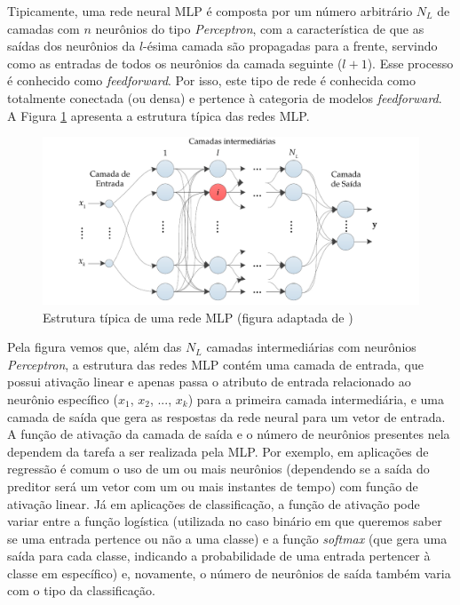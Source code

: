 \documentclass[a4paper, 12pt]{article}
\begin{document}
Tipicamente, uma rede neural MLP é composta por um número arbitrário $N_L$ de  camadas com $n$ neurônios do tipo \textit{Perceptron}, com a característica de que as saídas dos neurônios da $l$-ésima camada são propagadas para a frente, servindo como as entradas de todos os neurônios da camada seguinte ($l+1$). Esse processo é conhecido como \textit{feedforward}. Por isso, este tipo de rede é conhecida como totalmente conectada (ou densa) e pertence à categoria de modelos \textit{feedforward}. A Figura \ref{fig:mlp-architecture} apresenta a estrutura típica das redes MLP.

\begin{figure}[!ht]
\centering
\includegraphics[scale = 0.8]{mlp-network.pdf}
\caption{Estrutura típica de uma rede MLP (figura adaptada de \cite{boccato2013novas}) }
\label{fig:mlp-architecture}
\end{figure}

Pela figura vemos que, além das $N_L$ camadas intermediárias com neurônios \textit{Perceptron}, a estrutura das redes MLP contém uma camada de entrada, que possui ativação linear e apenas passa o atributo de entrada relacionado ao neurônio específico ($x_1$, $x_2$, ..., $x_k$) para a primeira camada intermediária, e uma camada de saída que gera as respostas da rede neural para um vetor de entrada. A função de ativação da camada de saída e o número de neurônios presentes nela dependem da tarefa a ser realizada pela MLP. Por exemplo, em aplicações de regressão é comum o uso de um ou mais neurônios (dependendo se a saída do preditor será um vetor com um ou mais instantes de tempo) com função de ativação linear. Já em aplicações de classificação, a função de ativação pode variar entre a função logística (utilizada no caso binário em que queremos saber se uma entrada pertence ou não a uma classe) e a função \textit{softmax} (que gera uma saída para cada classe, indicando a probabilidade de uma entrada pertencer à classe em específico) e, novamente, o número de neurônios de saída também varia com o tipo da classificação.
\end{document}
